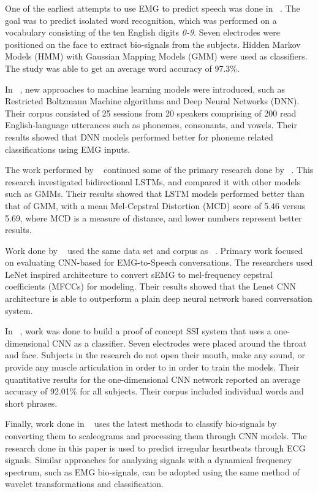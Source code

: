 \documentclass[conference]{IEEEtran}
\begin{document}
One of the earliest attempts to use EMG to predict speech was done in ~\cite{maier-hein_session_2005}. The goal was to predict isolated word recognition, which was performed on a vocabulary consisting of the ten English digits \textit{0-9}. Seven electrodes were positioned on the face to extract bio-signals from the subjects. Hidden Markov Models (HMM) with Gaussian Mapping Models (GMM) were used as classifiers. The study was able to get an average word accuracy of 97.3\%. 

In ~\cite{wand_pattern_2014}, new approaches to  machine learning models were introduced, such as Restricted Boltzmann Machine algorithms and Deep Neural Networks (DNN). Their corpus consisted of 25 sessions from 20 speakers comprising of 200 read English-language utterances such as phonemes, consonants, and vowels. Their results showed that DNN models performed better for phoneme related classifications using EMG inputs. 

The work performed by ~\cite{janke_emg--speech:_2017} continued some of the primary research done by ~\cite{wand_pattern_2014}. This research investigated bidirectional LSTMs, and compared it with other models such as GMMs. Their results showed that LSTM models performed better than that of GMM, with a mean Mel-Cepstral Distortion (MCD) score of 5.46 versus 5.69, where MCD is a measure of distance, and lower numbers represent better results.

Work done by ~\cite{diener_session-independent_nodate} used the same data set and corpus as ~\cite{janke_emg--speech:_2017}. Primary work focused on evaluating CNN-based for EMG-to-Speech conversations. The researchers used LeNet inspired architecture to convert sEMG  to mel-frequency cepstral coefficients (MFCCs) for modeling. Their results showed that the Lenet CNN architecture is able to outperform a plain deep neural network based conversation system. 

In ~\cite{kapur_alterego:_2018}, work was done to build a proof of concept SSI system that uses a one-dimensional CNN as a classifier. Seven electrodes were placed around the throat and face.  Subjects in the research do not open their mouth, make any sound, or provide any muscle articulation in order to in order to train the models. Their quantitative results for the one-dimensional CNN network reported an average accuracy of 92.01\% for all subjects. Their corpus included individual words and short phrases.

Finally, work done in ~\cite{noauthor_classify_nodate} uses the latest methods to classify bio-signals by converting them to scaleograms and processing them through CNN models. The research done in this paper is used to predict irregular heartbeats through ECG signals. Similar approaches for analyzing signals with a dynamical frequency spectrum, such as EMG bio-signals, can be adopted using the same method of wavelet transformations and classification. 
\end{document}
